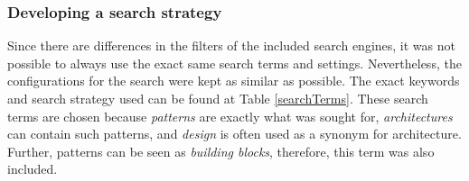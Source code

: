\documentclass{bmcart}
\begin{document}
\subsubsection{Developing a search strategy}

Since there are differences in the filters of the included search engines, it was not possible to always use the exact same search terms and settings. Nevertheless, the configurations for the search were kept as similar as possible. The exact keywords and search strategy used can be found at Table \ref{searchTerms}. These search terms are chosen because \emph{patterns} are exactly what was sought for, \emph{architectures} can contain such patterns, and \emph{design} is often used as a synonym for architecture. Further, patterns can be seen as \emph{building blocks}, therefore, this term was also included. 






 
\end{document}

